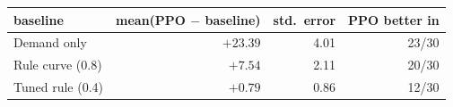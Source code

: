 \begin{tabular}{lrrr}
\toprule
baseline & mean(PPO $-$ baseline) & std.\ error & PPO better in \\
\midrule
Demand only & $+23.39$ & 4.01 & 23/30 \\
Rule curve (0.8) & $+7.54$ & 2.11 & 20/30 \\
Tuned rule (0.4) & $+0.79$ & 0.86 & 12/30 \\
\bottomrule
\end{tabular}
